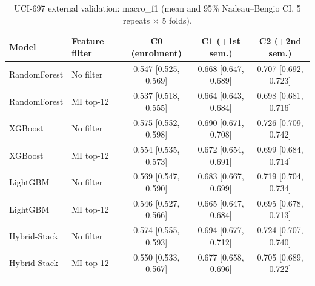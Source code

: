 \begin{table}[t]
\centering
\small
\caption{UCI-697 external validation: macro\_f1 (mean and 95\% Nadeau--Bengio CI, 5 repeats $\times$ 5 folds).}
\label{tab:uci697_macro_f1}
\begin{tabular}{llccc}
\toprule
Model & Feature filter & C0 (enrolment) & C1 (+1st sem.) & C2 (+2nd sem.) \\
\midrule
RandomForest & No filter & 0.547 [0.525, 0.569] & 0.668 [0.647, 0.689] & 0.707 [0.692, 0.723] \\
RandomForest & MI top-12 & 0.537 [0.518, 0.555] & 0.664 [0.643, 0.684] & 0.698 [0.681, 0.716] \\
\addlinespace
XGBoost & No filter & 0.575 [0.552, 0.598] & 0.690 [0.671, 0.708] & 0.726 [0.709, 0.742] \\
XGBoost & MI top-12 & 0.554 [0.535, 0.573] & 0.672 [0.654, 0.691] & 0.699 [0.684, 0.714] \\
\addlinespace
LightGBM & No filter & 0.569 [0.547, 0.590] & 0.683 [0.667, 0.699] & 0.719 [0.704, 0.734] \\
LightGBM & MI top-12 & 0.546 [0.527, 0.566] & 0.665 [0.647, 0.684] & 0.695 [0.678, 0.713] \\
\addlinespace
Hybrid-Stack & No filter & 0.574 [0.555, 0.593] & 0.694 [0.677, 0.712] & 0.724 [0.707, 0.740] \\
Hybrid-Stack & MI top-12 & 0.550 [0.533, 0.567] & 0.677 [0.658, 0.696] & 0.705 [0.689, 0.722] \\
\addlinespace
\bottomrule
\end{tabular}
\end{table}